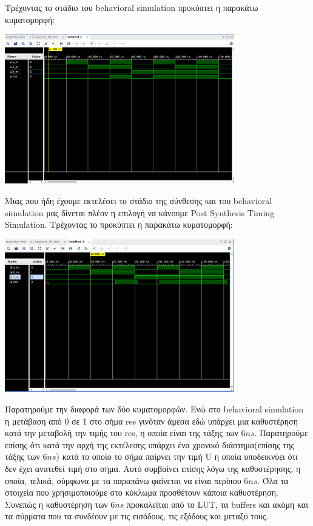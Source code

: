 \documentclass[]{article}
\begin{document}
Τρέχοντας το στάδιο του behavioral simulation προκύπτει η παρακάτω κυματομορφή:
\begin{center}
	\includegraphics[width=10cm]{behavioral.png}
\end{center}

Μιας που ήδη έχουμε εκτελέσει το στάδιο της σύνθεσης και του behavioral simulation μας δίνεται πλέον η επιλογή να κάνουμε Post Synthesis Timing Simulation.
Τρέχοντας το προκύπτει η παρακάτω κυματομορφή:
\begin{center}
	\includegraphics[width=10cm]{post_synthesis_timing.png}
\end{center}

Παρατηρούμε την διαφορά των δύο κυματομορφών. Ενώ στο behavioral simulation η μετάβαση από 0 σε 1 στο σήμα res γινόταν άμεσα εδώ
υπάρχει μια καθυστέρηση κατά την μεταβολή την τιμής του res, η οποία είναι της τάξης των $6ns$. Παρατηρούμε επίσης ότι κατά την αρχή
της εκτέλεσης υπάρχει ένα χρονικό διάστημα(επίσης της τάξης των $6ns$) κατά το οποίο το σήμα παίρνει την τιμή U η οποία υποδεικνύει ότι δεν έχει ανατεθεί τιμή στο σήμα.
Αυτό συμβαίνει επίσης λόγω της καθυστέρησης, η οποία, τελικά, σύμφωνα με τα παραπάνω φαίνεται να είναι περίπου $6ns$.
Όλα τα στοιχεία που χρησιμοποιούμε στο κύκλωμα προσθέτουν κάποια καθυστέρηση. Συνεπώς η καθυστέρηση των $6ns$ προκαλείται από το LUT, τα buffers και ακόμη και τα σύρματα που τα συνδέουν με τις εισόδους, τις εξόδους και μεταξύ τους.
\end{document}
